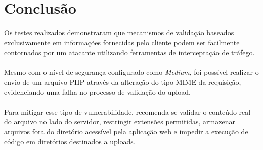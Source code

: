 \section{Conclusão}

\paragraph{}
Os testes realizados demonstraram que mecanismos de validação baseados
exclusivamente em informações fornecidas pelo cliente podem ser facilmente
contornados por um atacante utilizando ferramentas de interceptação de tráfego.

\paragraph{}
Mesmo com o nível de segurança configurado como \textit{Medium}, foi possível
realizar o envio de um arquivo PHP através da alteração do tipo MIME da
requisição, evidenciando uma falha no processo de validação do upload.

\paragraph{}
Para mitigar esse tipo de vulnerabilidade, recomenda-se validar o conteúdo real
do arquivo no lado do servidor, restringir extensões permitidas, armazenar
arquivos fora do diretório acessível pela aplicação web e impedir a execução de
código em diretórios destinados a uploads.
